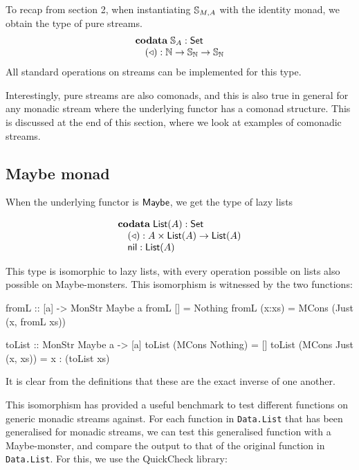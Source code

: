 \documentclass{article}
\begin{document}
To recap from section 2, when instantiating $\mathbb{S}_{M,A}$ with the identity monad, we obtain the type of pure streams.
$$
\begin{array}[t]{l}
\mathbf{codata}\;
\mathbb{S}_{A}:\mathsf{Set}\\
\quad (\triangleleft): \mathbb{N}\rightarrow \mathbb{S}_{\mathbb{N}} \rightarrow\mathbb{S}_{\mathbb{N}}
\end{array}
$$
All standard operations on streams can be implemented for this type.

Interestingly, pure streams are also comonads, and this is also true in general for any monadic stream where the underlying functor has a comonad structure. This is discussed at the end of this section, where we look at examples of comonadic streams.

\subsection{Maybe monad}

When the underlying functor is $\mathsf{Maybe}$, we get the type of lazy lists

$$
\begin{array}[t]{l}
\mathbf{codata}\;
\mathsf{List}(A):\mathsf{Set}\\
\quad (\triangleleft): A\times \mathsf{List}(A)\rightarrow\mathsf{List}(A)\\
\quad \mathsf{nil}: \mathsf{List}(A)
\end{array}
$$

This type is isomorphic to lazy lists, with every operation possible on lists also possible on Maybe-monsters. This isomorphism is witnessed by the two functions:

\begin{haskell}
fromL :: [a] -> MonStr Maybe a
fromL [] = Nothing
fromL (x:xs) = MCons (Just (x, fromL xs))

toList :: MonStr Maybe a -> [a]
toList (MCons Nothing) = []
toList (MCons Just (x, xs)) = x : (toList xs)
\end{haskell} 

It is clear from the definitions that these are the exact inverse of one another. 

This isomorphism has provided a useful benchmark to test different functions on generic monadic streams against. For each function in \verb+Data.List+ that has been generalised for monadic streams, we can test this generalised function with a Maybe-monster, and compare the output to that of the original function in \verb+Data.List+. For this, we use the QuickCheck library:

\end{document}
